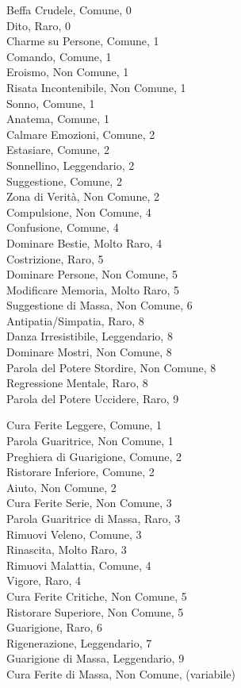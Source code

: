 \begin{multicols}{3}

Beffa Crudele, Comune, 0\\
Dito, Raro, 0\\
Charme su Persone, Comune, 1\\
Comando, Comune, 1\\
Eroismo, Non Comune, 1\\
Risata Incontenibile, Non Comune, 1\\
Sonno, Comune, 1\\
Anatema, Comune, 1\\
Calmare Emozioni, Comune, 2\\
Estasiare, Comune, 2\\
Sonnellino, Leggendario, 2\\
Suggestione, Comune, 2\\
Zona di Verità, Non Comune, 2\\
Compulsione, Non Comune, 4\\
Confusione, Comune, 4\\
Dominare Bestie, Molto Raro, 4\\
Costrizione, Raro, 5\\
Dominare Persone, Non Comune, 5\\
Modificare Memoria, Molto Raro, 5\\
Suggestione di Massa, Non Comune, 6\\
Antipatia/Simpatia, Raro, 8\\
Danza Irresistibile, Leggendario, 8\\
Dominare Mostri, Non Comune, 8\\
Parola del Potere Stordire, Non Comune, 8\\
Regressione Mentale, Raro, 8\\
Parola del Potere Uccidere, Raro, 9\\


Cura Ferite Leggere, Comune, 1\\
Parola Guaritrice, Non Comune, 1\\
Preghiera di Guarigione, Comune, 2\\
Ristorare Inferiore, Comune, 2\\
Aiuto, Non Comune, 2\\
Cura Ferite Serie, Non Comune, 3\\
Parola Guaritrice di Massa, Raro, 3\\
Rimuovi Veleno, Comune, 3\\
Rinascita, Molto Raro, 3\\
Rimuovi Malattia, Comune, 4\\
Vigore, Raro, 4\\
Cura Ferite Critiche, Non Comune, 5\\
Ristorare Superiore, Non Comune, 5\\
Guarigione, Raro, 6\\
Rigenerazione, Leggendario, 7\\
Guarigione di Massa, Leggendario, 9\\
Cura Ferite di Massa, Non Comune, (variabile)\\



\end{multicols}
